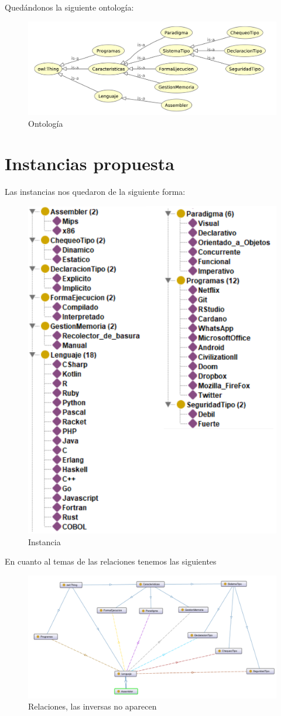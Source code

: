 \documentclass[12pt, titlepage, a4paper]{article}
\begin{document}
\noindent Quedándonos la siguiente ontología:
\begin{figure}[H]
    \centering
    \includegraphics[width=.8\textwidth]{Imagenes/Ontologia.png}
    \caption{Ontología}
\end{figure}

\section{Instancias propuesta}
Las instancias nos quedaron de la siguiente forma:
\begin{figure}[H]
    \centering
    \includegraphics[width=.5\textwidth]{Imagenes/Instancias.png}
    \caption{Instancia}
\end{figure}

En cuanto al temas de las relaciones tenemos las siguientes
\begin{figure}[H]
    \centering
    \includegraphics[width=.8\textwidth]{Imagenes/Relaciones.png}
    \caption{Relaciones, las inversas no aparecen}
\end{figure}
\end{document}
